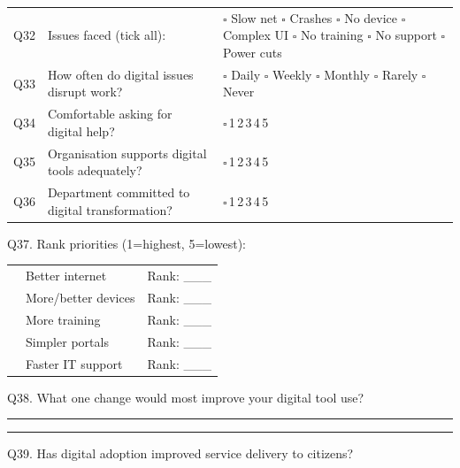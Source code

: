 \documentclass[10pt,a4paper]{article}
\newcommand{\likert}{{\Large$\square$}\,1\quad{\Large$\square$}\,2\quad{\Large$\square$}\,3\quad{\Large$\square$}\,4\quad{\Large$\square$}\,5}
\begin{document}
\vspace{4pt}
\vspace{4pt}

\noindent\begin{tabularx}{\textwidth}{@{}L{0.6cm} X L{5.5cm}@{}}
Q32 & Issues faced (tick all): & {\Large$\square$} Slow net {\Large$\square$} Crashes {\Large$\square$} No device {\Large$\square$} Complex UI {\Large$\square$} No training {\Large$\square$} No support {\Large$\square$} Power cuts \\[3pt]
Q33 & How often do digital issues disrupt work? & {\Large$\square$} Daily {\Large$\square$} Weekly {\Large$\square$} Monthly {\Large$\square$} Rarely {\Large$\square$} Never \\[3pt]
Q34 & Comfortable asking for digital help? & \likert \\[3pt]
Q35 & Organisation supports digital tools adequately? & \likert \\[3pt]
Q36 & Department committed to digital transformation? & \likert \\
\end{tabularx}

\vspace{4pt}
\vspace{4pt}

\noindent Q37. Rank priorities (1=highest, 5=lowest):\vspace{3pt}

\noindent\begin{tabularx}{\textwidth}{@{}L{0.6cm} X L{1.5cm}@{}}
& Better internet & Rank: \_\_\_ \\[2pt]
& More/better devices & Rank: \_\_\_ \\[2pt]
& More training & Rank: \_\_\_ \\[2pt]
& Simpler portals & Rank: \_\_\_ \\[2pt]
& Faster IT support & Rank: \_\_\_ \\
\end{tabularx}

\vspace{3pt}
\noindent Q38. What one change would most improve your digital tool use?\vspace{3pt}

\noindent\rule{\textwidth}{0.4pt}\vspace{3pt}\rule{\textwidth}{0.4pt}\vspace{3pt}

\noindent Q39. Has digital adoption improved service delivery to citizens?\vspace{2pt}
\end{document}

